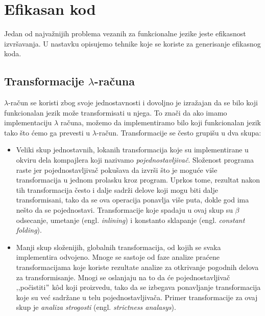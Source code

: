 \section{Efikasan kod}


Jedan od najvažnijih problema vezanih za funkcionalne jezike jeste efikasnost izvršavanja. 
U nastavku opisujemo tehnike koje se koriste za generisanje efikasnog koda.	


\subsection{Transformacije $\lambda$-računa}

$\lambda$-račun se koristi zbog svoje jednostavnosti i dovoljno je izražajan da se bilo koji funkcionalan jezik može transformisati u njega. To znači da ako imamo implementaciju $\lambda$ računa, možemo da implementiramo  bilo koji funkcionalan jezik tako što ćemo ga prevesti u $\lambda$-račun. Transformacije se često grupišu u dva skupa:


\begin{itemize}
	\item Veliki skup jednostavnih, lokanih transformacija koje su implementirane u okviru dela kompajlera koji nazivamo \textit{pojednostavljivač}. Složenost programa raste jer pojednostavljivač pokušava da izvrši što je moguće više transformacija u jednom prolasku kroz program. Uprkos tome, rezultat nakon tih transformacija često i dalje sadrži delove koji mogu biti dalje transformisani, tako da se ova operacija ponavlja više puta, dokle god ima nešto da se pojednostavi. Transformacije koje spadaju u ovaj skup su $\beta$ odsecanje, umetanje (engl. \textit{inlining}) i konstanto sklapanje (engl. \textit{constant folding}).
	
	\item Manji skup složenijih, globalnih transformacija, od kojih se svaka implementira odvojeno. Mnoge se sastoje od faze analize praćene transformacijama koje koriste rezultate analize za otkrivanje pogodnih delova za transformisanje. Mnogi se oslanjaju na to da će pojednostavljivač ‚‚počistiti$"$ k\^ od koji proizvedu, tako da se izbegava ponavljanje transformacija koje su već sadržane u telu pojednostavljivača. Primer transformacije za ovaj skup je  \textit{analiza strogosti} (engl. \textit{strictness analasys}). 
	
\end{itemize}
  

